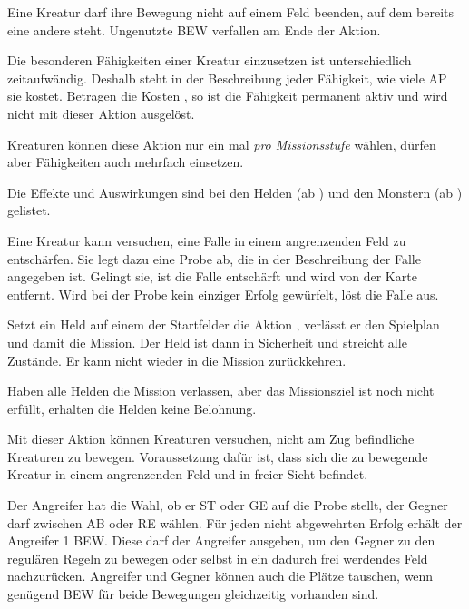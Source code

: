 {			Eine Kreatur darf ihre Bewegung nicht auf einem Feld beenden, auf dem bereits eine andere steht. Ungenutzte BEW verfallen am Ende der Aktion.

			Die besonderen Fähigkeiten einer Kreatur einzusetzen ist unterschiedlich zeitaufwändig. Deshalb steht in der Beschreibung jeder Fähigkeit, wie viele AP sie kostet. Betragen die Kosten , so ist die Fähigkeit permanent aktiv und wird nicht mit dieser Aktion ausgelöst.

			Kreaturen können diese Aktion nur ein mal \emph{pro Missionsstufe} wählen, dürfen aber Fähigkeiten auch mehrfach einsetzen.


			\noindent
			Die Effekte und Auswirkungen sind bei den Helden (ab ) und den Monstern (ab ) gelistet.

			Eine Kreatur kann versuchen, eine Falle in einem angrenzenden Feld zu entschärfen. Sie legt dazu eine Probe ab, die in der Beschreibung der Falle angegeben ist. Gelingt sie, ist die Falle entschärft und wird von der Karte entfernt. Wird bei der Probe kein einziger Erfolg gewürfelt, löst die Falle aus.

			Setzt ein Held auf einem der Startfelder die Aktion , verlässt er den Spielplan und damit die Mission. Der Held ist dann in Sicherheit und streicht alle Zustände. Er kann nicht wieder in die Mission zurückkehren.

			Haben alle Helden die Mission verlassen, aber das Missionsziel ist noch nicht erfüllt, erhalten die Helden keine Belohnung.

			Mit dieser Aktion können Kreaturen versuchen, nicht am Zug befindliche Kreaturen zu bewegen. Voraussetzung dafür ist, dass sich die zu bewegende Kreatur in einem angrenzenden Feld und in freier Sicht befindet.

			Der Angreifer hat die Wahl, ob er ST oder GE auf die Probe stellt, der Gegner darf zwischen AB oder RE wählen. Für jeden nicht abgewehrten Erfolg erhält der Angreifer 1 BEW. Diese darf der Angreifer ausgeben, um den Gegner zu den regulären Regeln zu bewegen oder selbst in ein dadurch frei werdendes Feld nachzurücken. Angreifer und Gegner können auch die Plätze tauschen, wenn genügend BEW für beide Bewegungen gleichzeitig vorhanden sind.

}
